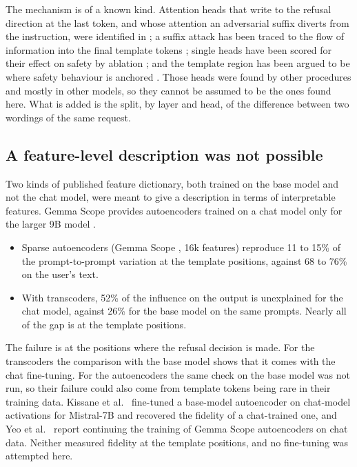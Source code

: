 \documentclass[11pt]{article}
\begin{document}
The mechanism is of a known kind. Attention heads that write to the refusal direction at the last token, and whose attention an adversarial suffix diverts from the instruction, were identified in \cite{arditi}; a suffix attack has been traced to the flow of information into the final template tokens \cite{bentov}; single heads have been scored for their effect on safety by ablation \cite{zhou}; and the template region has been argued to be where safety behaviour is anchored \cite{leong}. Those heads were found by other procedures and mostly in other models, so they cannot be assumed to be the ones found here. What is added is the split, by layer and head, of the difference between two wordings of the same request.

\subsection{A feature-level description was not possible}
\label{sec:features}

Two kinds of published feature dictionary, both trained on the base model and not the chat model, were meant to give a description in terms of interpretable features. Gemma Scope provides autoencoders trained on a chat model only for the larger 9B model \cite{gemmascope}.

\begin{itemize}
\item Sparse autoencoders (Gemma Scope \cite{gemmascope}, 16k features) reproduce 11 to 15\% of the prompt-to-prompt variation at the template positions, against 68 to 76\% on the user's text.
\item With transcoders, 52\% of the influence on the output is unexplained for the chat model, against 26\% for the base model on the same prompts. Nearly all of the gap is at the template positions.
\end{itemize}

The failure is at the positions where the refusal decision is made. For the transcoders the comparison with the base model shows that it comes with the chat fine-tuning. For the autoencoders the same check on the base model was not run, so their failure could also come from template tokens being rare in their training data. Kissane et al.\ \cite{kissane} fine-tuned a base-model autoencoder on chat-model activations for Mistral-7B and recovered the fidelity of a chat-trained one, and Yeo et al.\ \cite{yeo} report continuing the training of Gemma Scope autoencoders on chat data. Neither measured fidelity at the template positions, and no fine-tuning was attempted here.
\end{document}
